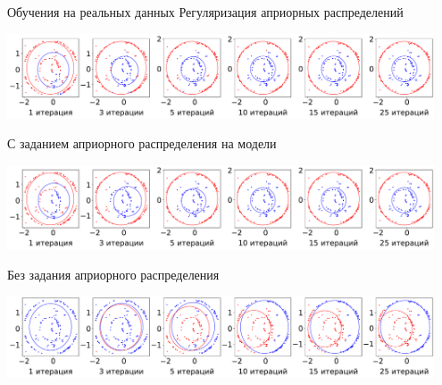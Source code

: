 \documentclass[9pt,pdf,hyperref={unicode}]{beamer}
\begin{document}
\begin{frame}{Обучения на реальных данных}
\justifying
Регуляризация априорных распределений
\begin{center}
	\includegraphics[width=0.95\textwidth]{result/experiment_real_regular}
\end{center}
С заданием априорного распределения на модели
\begin{center}
	\includegraphics[width=0.95\textwidth]{result/experiment_real_prior}
\end{center}
Без задания априорного распределения
\begin{center}
	\includegraphics[width=0.95\textwidth]{result/experiment_real_not_prior}
\end{center}
\end{frame}
\end{document}
